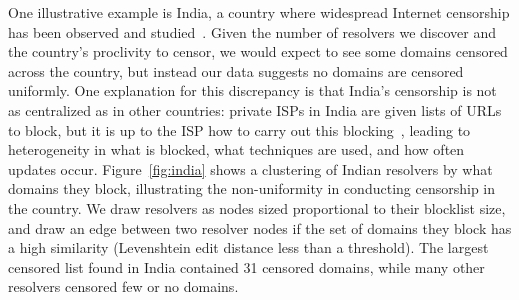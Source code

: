 One illustrative example is India, a country where widespread Internet censorship has
been observed and studied~\cite{singh2020india,Yadav2018a}. Given the number
of resolvers we discover and the country's proclivity to censor, we would expect to see
some domains censored across the country, but instead our data suggests no
domains are censored uniformly. One explanation for this discrepancy is that
India's censorship is not as centralized as in other countries: private ISPs in
India are given lists of URLs to block, but it is up to the ISP how to carry out
this blocking~\cite{Gosain2017a}, leading to heterogeneity in what is blocked,
what techniques are used, and how often updates occur.  Figure~\ref{fig:india}
shows a clustering of Indian resolvers by what domains they block, illustrating the non-uniformity in
conducting censorship in the country. We draw resolvers as nodes sized proportional
to their blocklist size, and draw an edge between two resolver
nodes if the set of domains they block has a high similarity (Levenshtein edit
distance less than a threshold). The largest censored list found in India contained 31
censored domains, while many other resolvers censored few or no domains.


\FigIndiaCluster
\fi


